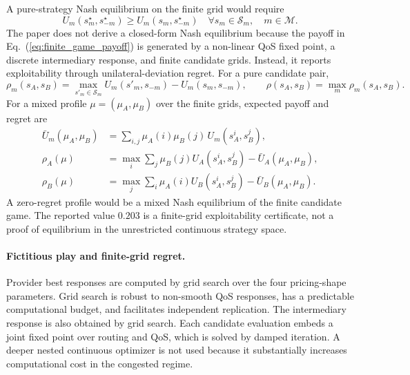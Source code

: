 \documentclass[11pt,a4paper]{article}
\newcommand{\M}{\mathcal{M}}
\begin{document}
A pure-strategy Nash equilibrium on the finite grid would require
\begin{equation}
  U_m(s_m^\star,s_{-m}^\star)
  \ge
  U_m(s_m,s_{-m}^\star)
  \quad
  \forall s_m\in\mathcal S_m,\quad m\in\M .
  \label{eq:pure_nash}
\end{equation}
The paper does not derive a closed-form Nash equilibrium because the payoff in Eq.~(\ref{eq:finite_game_payoff}) is generated by a non-linear QoS fixed point, a discrete intermediary response, and finite candidate grids. Instead, it reports exploitability through unilateral-deviation regret. For a pure candidate pair,
\begin{equation}
  \rho_m(s_A,s_B)
  =
  \max_{s'_m\in\mathcal S_m}U_m(s'_m,s_{-m})
  -U_m(s_m,s_{-m}),
  \qquad
  \rho(s_A,s_B)=\max_m\rho_m(s_A,s_B).
  \label{eq:pure_regret}
\end{equation}
For a mixed profile $\mu=(\mu_A,\mu_B)$ over the finite grids, expected payoff and regret are
\begin{align}
  \bar U_m(\mu_A,\mu_B)
  &=
  \sum_{i,j}\mu_A(i)\mu_B(j)\,U_m(s_A^i,s_B^j), \label{eq:mixed_payoff}\\
  \rho_A(\mu)
  &=
  \max_i\sum_j\mu_B(j)U_A(s_A^i,s_B^j)
  -\bar U_A(\mu_A,\mu_B), \nonumber\\
  \rho_B(\mu)
  &=
  \max_j\sum_i\mu_A(i)U_B(s_A^i,s_B^j)
  -\bar U_B(\mu_A,\mu_B). \label{eq:mixed_regret}
\end{align}
A zero-regret profile would be a mixed Nash equilibrium of the finite candidate game. The reported value $0.203$ is a finite-grid exploitability certificate, not a proof of equilibrium in the unrestricted continuous strategy space.

\paragraph{Fictitious play and finite-grid regret.}

Provider best responses are computed by grid search over the four pricing-shape parameters. Grid search is robust to non-smooth QoS responses, has a predictable computational budget, and facilitates independent replication. The intermediary response is also obtained by grid search. Each candidate evaluation embeds a joint fixed point over routing and QoS, which is solved by damped iteration. A deeper nested continuous optimizer is not used because it substantially increases computational cost in the congested regime.
\end{document}
